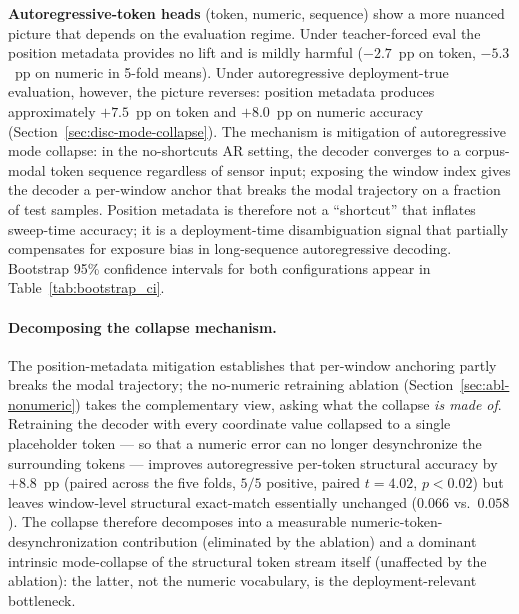 \documentclass[sensors,article,submit,moreauthors,pdftex]{Definitions/mdpi}
\begin{document}
\textbf{Autoregressive-token heads} (token, numeric, sequence) show a more nuanced picture that depends on the evaluation regime. Under teacher-forced eval the position metadata provides no lift and is mildly harmful ($-2.7$~pp on token, $-5.3$~pp on numeric in 5-fold means). Under autoregressive deployment-true evaluation, however, the picture reverses: position metadata produces approximately $+7.5$~pp on token and $+8.0$~pp on numeric accuracy (Section~\ref{sec:disc-mode-collapse}). The mechanism is mitigation of autoregressive mode collapse: in the no-shortcuts AR setting, the decoder converges to a corpus-modal token sequence regardless of sensor input; exposing the window index gives the decoder a per-window anchor that breaks the modal trajectory on a fraction of test samples. Position metadata is therefore not a ``shortcut'' that inflates sweep-time accuracy; it is a deployment-time disambiguation signal that partially compensates for exposure bias in long-sequence autoregressive decoding. Bootstrap 95\% confidence intervals for both configurations appear in Table~\ref{tab:bootstrap_ci}.

\paragraph{Decomposing the collapse mechanism.} The position-metadata
mitigation establishes that per-window anchoring partly breaks the modal
trajectory; the no-numeric retraining ablation (Section~\ref{sec:abl-nonumeric})
takes the complementary view, asking what the collapse \emph{is made of}.
Retraining the decoder with every coordinate value collapsed to a single
placeholder token --- so that a numeric error can no longer desynchronize
the surrounding tokens --- improves autoregressive per-token structural
accuracy by $+8.8$~pp (paired across the five folds, $5/5$ positive,
paired $t=4.02$, $p\!<\!0.02$) but leaves window-level structural exact-match
essentially unchanged ($0.066$ vs.\ $0.058$). The collapse therefore
decomposes into a measurable numeric-token-desynchronization contribution
(eliminated by the ablation) and a dominant intrinsic mode-collapse of the
structural token stream itself (unaffected by the ablation): the latter,
not the numeric vocabulary, is the deployment-relevant bottleneck.
\end{document}
